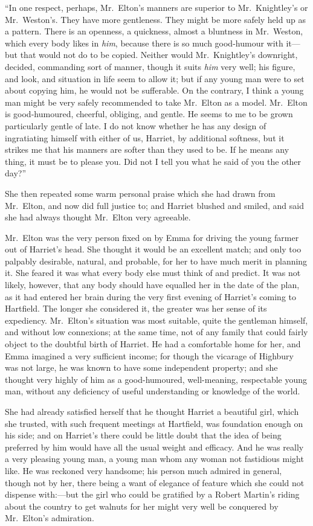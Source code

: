 ``In one respect, perhaps, Mr.\ Elton's manners are superior
to Mr.\ Knightley's or Mr.\ Weston's. They have more gentleness.
They might be more safely held up as a pattern.  There is an openness,
a quickness, almost a bluntness in Mr.\ Weston, which every body
likes in \emph{him}, because there is so much good-humour with it---but
that would not do to be copied.  Neither would Mr.\ Knightley's
downright, decided, commanding sort of manner, though it suits
\emph{him} very well; his figure, and look, and situation in life seem
to allow it; but if any young man were to set about copying him,
he would not be sufferable.  On the contrary, I think a young man
might be very safely recommended to take Mr.\ Elton as a model.
Mr.\ Elton is good-humoured, cheerful, obliging, and gentle.
He seems to me to be grown particularly gentle of late.  I do not
know whether he has any design of ingratiating himself with either
of us, Harriet, by additional softness, but it strikes me that his
manners are softer than they used to be.  If he means any thing,
it must be to please you.  Did not I tell you what he said of you
the other day?''

She then repeated some warm personal praise which she had drawn
from Mr.\ Elton, and now did full justice to; and Harriet blushed
and smiled, and said she had always thought Mr.\ Elton very agreeable.

Mr.\ Elton was the very person fixed on by Emma for driving
the young farmer out of Harriet's head.  She thought it would
be an excellent match; and only too palpably desirable, natural,
and probable, for her to have much merit in planning it.
She feared it was what every body else must think of and predict.
It was not likely, however, that any body should have equalled
her in the date of the plan, as it had entered her brain during
the very first evening of Harriet's coming to Hartfield.  The longer
she considered it, the greater was her sense of its expediency.
Mr.\ Elton's situation was most suitable, quite the gentleman himself,
and without low connexions; at the same time, not of any family
that could fairly object to the doubtful birth of Harriet.  He had a
comfortable home for her, and Emma imagined a very sufficient income;
for though the vicarage of Highbury was not large, he was known
to have some independent property; and she thought very highly
of him as a good-humoured, well-meaning, respectable young man,
without any deficiency of useful understanding or knowledge of the world.

She had already satisfied herself that he thought Harriet a beautiful
girl, which she trusted, with such frequent meetings at Hartfield,
was foundation enough on his side; and on Harriet's there could be
little doubt that the idea of being preferred by him would have all
the usual weight and efficacy.  And he was really a very pleasing
young man, a young man whom any woman not fastidious might like.
He was reckoned very handsome; his person much admired in general,
though not by her, there being a want of elegance of feature which
she could not dispense with:---but the girl who could be gratified
by a Robert Martin's riding about the country to get walnuts
for her might very well be conquered by Mr.\ Elton's admiration.



